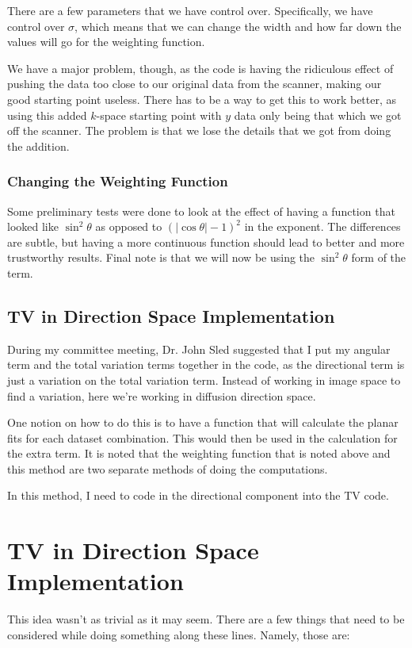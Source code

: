 \documentclass[11 pt]{article}
\let\oldsection\section
\renewcommand\section{\clearpage\newpage\oldsection}
\begin{document}
    There are a few parameters that we have control over. Specifically, we have control over $\sigma$, which means that we can change the width and how far down the values will go for the weighting function.

    We have a major problem, though, as the code is having the ridiculous effect of pushing the data too close to our original data from the scanner, making our good starting point useless. There has to be a way to get this to work better, as using this added $k$-space starting point with $y$ data only being that which we got off the scanner. The problem is that we lose the details that we got from doing the addition. 

    \subsubsection{Changing the Weighting Function}

      Some preliminary tests were done to look at the effect of having a function that looked like $\sin^2 \theta$ as opposed to $(|\cos \theta | - 1)^2$ in the exponent. The differences are subtle, but having a more continuous function should lead to better and more trustworthy results. Final note is that we will now be using the $\sin^2 \theta$ form of the term.

  \subsection{TV in Direction Space Implementation}

    During my committee meeting, Dr. John Sled suggested that I put my angular term and the total variation terms together in the code, as the directional term is just a variation on the total variation term. Instead of working in image space to find a variation, here we're working in diffusion direction space.

    One notion on how to do this is to have a function that will calculate the planar fits for each dataset combination. This would then be used in the calculation for the extra term. It is noted that the weighting function that is noted above and this method are two separate methods of doing the computations. 

    In this method, I need to code in the directional component into the TV code. 

\section{TV in Direction Space Implementation}
  This idea wasn't as trivial as it may seem. There are a few things that need to be considered while doing something along these lines. Namely, those are:
\end{document}
